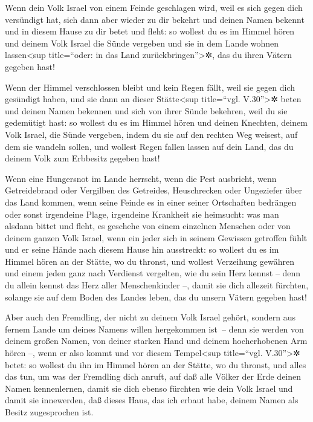 Wenn dein Volk Israel von einem Feinde geschlagen wird,
weil es sich gegen dich versündigt hat, sich dann aber wieder zu dir
bekehrt und deinen Namen bekennt und in diesem Hause zu dir betet und
fleht: so wollest du es im Himmel hören und deinem Volk
Israel die Sünde vergeben und sie in dem Lande wohnen
lassen\textless sup title=``oder: in das Land
zurückbringen''\textgreater✲, das du ihren Vätern gegeben hast!

Wenn der Himmel verschlossen bleibt und kein Regen fällt,
weil sie gegen dich gesündigt haben, und sie dann an dieser
Stätte\textless sup title=``vgl. V.30''\textgreater✲ beten und deinen
Namen bekennen und sich von ihrer Sünde bekehren, weil du sie gedemütigt
hast: so wollest du es im Himmel hören und deinen
Knechten, deinem Volk Israel, die Sünde vergeben, indem du sie auf den
rechten Weg weisest, auf dem sie wandeln sollen, und wollest Regen
fallen lassen auf dein Land, das du deinem Volk zum Erbbesitz gegeben
hast!

Wenn eine Hungersnot im Lande herrscht, wenn die Pest
ausbricht, wenn Getreidebrand oder Vergilben des Getreides, Heuschrecken
oder Ungeziefer über das Land kommen, wenn seine Feinde es in einer
seiner Ortschaften bedrängen oder sonst irgendeine Plage, irgendeine
Krankheit sie heimsucht: was man alsdann bittet und
fleht, es geschehe von einem einzelnen Menschen oder von deinem ganzen
Volk Israel, wenn ein jeder sich in seinem Gewissen getroffen fühlt und
er seine Hände nach diesem Hause hin ausstreckt: so
wollest du es im Himmel hören an der Stätte, wo du thronst, und wollest
Verzeihung gewähren und einem jeden ganz nach Verdienst vergelten, wie
du sein Herz kennst -- denn du allein kennst das Herz aller
Menschenkinder --, damit sie dich allezeit fürchten,
solange sie auf dem Boden des Landes leben, das du unsern Vätern gegeben
hast!

Aber auch den Fremdling, der nicht zu deinem Volk Israel
gehört, sondern aus fernem Lande um deines Namens willen hergekommen
ist~-- denn sie werden von deinem großen Namen, von
deiner starken Hand und deinem hocherhobenen Arm hören --, wenn er also
kommt und vor diesem Tempel\textless sup title=``vgl.
V.30''\textgreater✲ betet: so wollest du ihn im Himmel
hören an der Stätte, wo du thronst, und alles das tun, um was der
Fremdling dich anruft, auf daß alle Völker der Erde deinen Namen
kennenlernen, damit sie dich ebenso fürchten wie dein Volk Israel und
damit sie innewerden, daß dieses Haus, das ich erbaut habe, deinem Namen
als Besitz zugesprochen ist.

